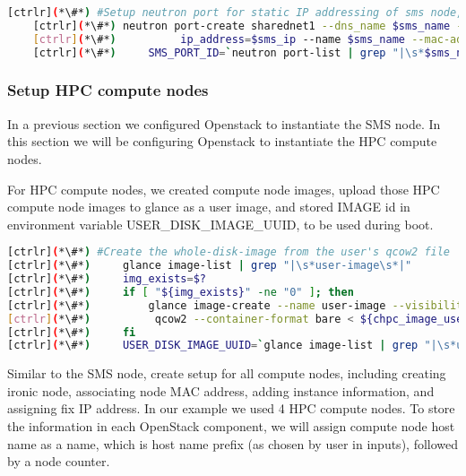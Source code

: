     
    \begin{lstlisting}[language=bash,keywords={}]
    [ctrlr](*\#*) #Setup neutron port for static IP addressing of sms node, this is an optional part
    [ctrlr](*\#*) neutron port-create sharednet1 --dns_name $sms_name --fixed-ip \
    [ctrlr](*\#*)          ip_address=$sms_ip --name $sms_name --mac-address $sms_mac
    [ctrlr](*\#*)     SMS_PORT_ID=`neutron port-list | grep "|\s*$sms_name\s*|" | awk '{print $2}'`
	\end{lstlisting} 

\newpage
\subsubsection{Setup HPC compute nodes}

	In a previous section we configured Openstack to instantiate the SMS node. In this section we will be configuring Openstack to instantiate the HPC compute nodes.

	For HPC compute nodes, we created compute node images, upload those HPC compute node images to glance as a user image, and stored IMAGE id in environment variable USER\_DISK\_IMAGE\_UUID, to be used during boot.


\begin{lstlisting}[language=bash,keywords={}]
[ctrlr](*\#*) #Create the whole-disk-image from the user's qcow2 file
[ctrlr](*\#*)     glance image-list | grep "|\s*user-image\s*|"
[ctrlr](*\#*)     img_exists=$?
[ctrlr](*\#*)     if [ "${img_exists}" -ne "0" ]; then
[ctrlr](*\#*)         glance image-create --name user-image --visibility public --disk-format \
[ctrlr](*\#*)          qcow2 --container-format bare < ${chpc_image_user}
[ctrlr](*\#*)     fi
[ctrlr](*\#*)     USER_DISK_IMAGE_UUID=`glance image-list | grep "|\s*user-image\s*|" | awk '{print $2}'`
\end{lstlisting} 


	Similar to the SMS node, create setup for all compute nodes, including creating ironic node, associating node MAC address, adding instance information, and assigning fix IP address. In our example we used 4 HPC compute nodes. To store the information in each OpenStack component, we will assign compute node host name as a name, which is host name prefix (as chosen by user in inputs), followed by a node counter. 

